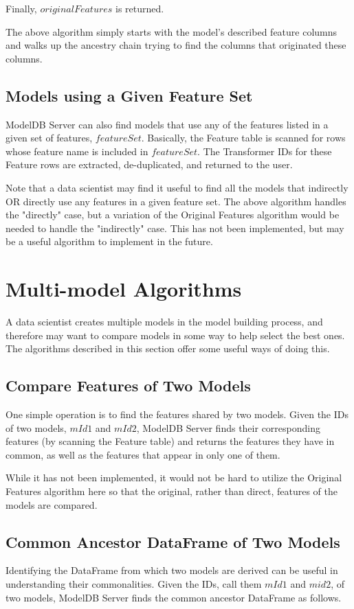 Finally, $originalFeatures$ is returned.

The above algorithm simply starts with the model's described feature columns and walks up the ancestry chain trying to find
the columns that originated these columns.

\subsection{Models using a Given Feature Set}
ModelDB Server can also find models that use any of the features listed in a given set of features, $featureSet$. Basically,
the Feature table is scanned for rows whose feature name is included in $featureSet$. The Transformer IDs for these
Feature rows are extracted, de-duplicated, and returned to the user.

Note that a data scientist may find it useful to find all the models that indirectly OR directly use any features in a 
given feature set. The above algorithm handles the "directly" case, but a variation of the Original Features algorithm would
be needed to handle the "indirectly" case. This has not been implemented, but may be a useful algorithm to implement in the future.

\section{Multi-model Algorithms}
A data scientist creates multiple models in the model building process, and therefore may want
to compare models in some way to help select the best ones. The algorithms
described in this section offer some useful ways of doing this.

\subsection{Compare Features of Two Models}
One simple operation is to find the features shared by two models. Given the IDs
of two models, $mId1$ and $mId2$, ModelDB Server finds their corresponding features 
(by scanning the Feature table) and returns the features they have in common, 
as well as the features that appear in only one of them.

While it has not been implemented, it would not be hard to utilize the Original Features algorithm here
so that the original, rather than direct, features of the models are compared.

\subsection{Common Ancestor DataFrame of Two Models}
Identifying the DataFrame from which two models are derived can be useful in
understanding their commonalities. Given the IDs, call them $mId1$ and $mid2$, 
of two models, ModelDB Server finds the common ancestor DataFrame as follows.

